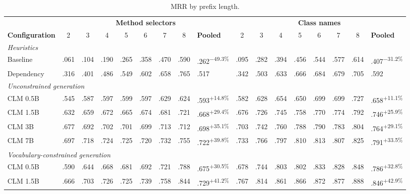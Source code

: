 \else
\begin{table}[t]
\centering
\caption{MRR by prefix length.}
\label{tab:mrr-by-prefix}
\setlength{\tabcolsep}{3.2pt}
\small
\begin{tabular}{lccccccc>{\columncolor{gray!6}}l@{\hspace{10pt}}ccccccc>{\columncolor{gray!6}}l}
\toprule
 & \multicolumn{8}{c}{\textbf{Method selectors}} & \multicolumn{8}{c}{\textbf{Class names}} \\
\textbf{Configuration} & 2 & 3 & 4 & 5 & 6 & 7 & 8 & \textbf{Pooled} & 2 & 3 & 4 & 5 & 6 & 7 & 8 & \textbf{Pooled} \\
\midrule
\multicolumn{17}{l}{\textit{Heuristics}} \\
Baseline & .061 & .104 & .190 & .265 & .358 & .470 & .590 & .262\textsuperscript{$-$49.3\%} & .095 & .282 & .394 & .456 & .544 & .577 & .614 & .407\textsuperscript{$-$31.2\%} \\
Dependency & .316 & .401 & .486 & .549 & .602 & .658 & .765 & .517 & .342 & .503 & .633 & .666 & .684 & .679 & .705 & .592 \\
\midrule
\multicolumn{17}{l}{\textit{Unconstrained generation}} \\
CLM 0.5B & .545 & .587 & .597 & .599 & .597 & .629 & .624 & .593\textsuperscript{$+$14.8\%} & .582 & .628 & .654 & .650 & .699 & .699 & .727 & .658\textsuperscript{$+$11.1\%} \\
CLM 1.5B & .632 & .659 & .672 & .665 & .674 & .681 & .721 & .668\textsuperscript{$+$29.4\%} & .676 & .726 & .745 & .758 & .770 & .774 & .792 & .746\textsuperscript{$+$25.9\%} \\
CLM 3B & .677 & .692 & .702 & .701 & .699 & .713 & .712 & .698\textsuperscript{$+$35.1\%} & .703 & .742 & .760 & .788 & .790 & .783 & .804 & .764\textsuperscript{$+$29.1\%} \\
CLM 7B & .697 & .718 & .724 & .725 & .720 & .732 & .755 & .722\textsuperscript{$+$39.8\%} & .733 & .766 & .797 & .810 & .813 & .807 & .825 & .791\textsuperscript{$+$33.5\%} \\
\midrule
\multicolumn{17}{l}{\textit{Vocabulary-constrained generation}} \\
CLM 0.5B & .590 & .644 & .668 & .681 & .692 & .721 & .788 & .675\textsuperscript{$+$30.5\%} & .678 & .744 & .803 & .802 & .833 & .828 & .848 & .786\textsuperscript{$+$32.8\%} \\
CLM 1.5B & .666 & .703 & .726 & .725 & .739 & .758 & .844 & .729\textsuperscript{$+$41.2\%} & .767 & .814 & .861 & .866 & .872 & .877 & .888 & .846\textsuperscript{$+$42.9\%} \\

\end{tabular}
\end{table}
